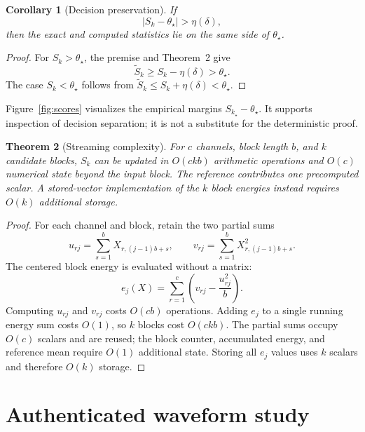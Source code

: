 \documentclass[10pt,letterpaper,twoside]{article}
\newtheorem{theorem}{Theorem}
\newtheorem{corollary}[theorem]{Corollary}
\begin{document}
\begin{corollary}[Decision preservation]
If
\begin{equation}
 |S_k-\theta_\star|>\eta(\delta),
 \end{equation}
then the exact and computed statistics lie on the same side of
$\theta_\star$.
\end{corollary}

\begin{proof}
For $S_k>\theta_\star$, the premise and Theorem~2 give
\begin{equation}
 \widetilde S_k\geq S_k-\eta(\delta)>\theta_\star.
\end{equation}
The case $S_k<\theta_\star$ follows from
$\widetilde S_k\leq S_k+\eta(\delta)<\theta_\star$.
\end{proof}

Figure~\ref{fig:scores} visualizes the empirical margins
$S_{k_\star}-\theta_\star$.  It supports inspection of decision separation;
it is not a substitute for the deterministic proof.

\begin{theorem}[Streaming complexity]
For $c$ channels, block length $b$, and $k$ candidate blocks,
$S_k$ can be updated in $O(ckb)$ arithmetic operations and $O(c)$ numerical
state beyond the input block.  The reference contributes one precomputed
scalar.  A stored-vector implementation of the $k$ block energies instead
requires $O(k)$ additional storage.
\end{theorem}

\begin{proof}
For each channel and block, retain the two partial sums
\begin{equation}
 u_{rj}=\sum_{s=1}^{b}X_{r,(j-1)b+s},
 \qquad
 v_{rj}=\sum_{s=1}^{b}X_{r,(j-1)b+s}^{2}.
\end{equation}
The centered block energy is evaluated without a matrix:
\begin{equation}
 e_j(X)=\sum_{r=1}^{c}\left(v_{rj}-\frac{u_{rj}^{2}}{b}\right).
\end{equation}
Computing $u_{rj}$ and $v_{rj}$ costs $O(cb)$ operations.  Adding $e_j$ to a
single running energy sum costs $O(1)$, so $k$ blocks cost $O(ckb)$.  The
partial sums occupy $O(c)$ scalars and are reused; the block counter,
accumulated energy, and reference mean require $O(1)$ additional state.
Storing all $e_j$ values uses $k$ scalars and therefore $O(k)$ storage.
\end{proof}

\section{Authenticated waveform study}
\end{document}
